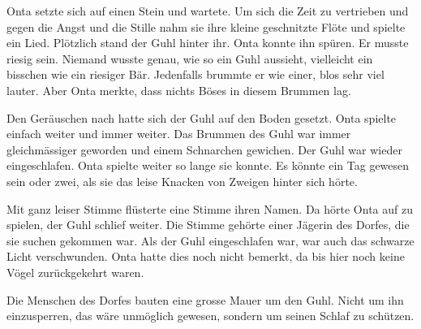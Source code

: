 Onta setzte sich auf einen Stein und wartete. Um sich die Zeit zu vertrieben und gegen die Angst und die Stille nahm sie ihre kleine geschnitzte Flöte und spielte ein Lied. Plötzlich stand der Guhl hinter ihr. Onta konnte ihn spüren. Er musste riesig sein. Niemand wusste genau, wie so ein Guhl aussieht, vielleicht ein bisschen wie ein riesiger Bär. Jedenfalls brummte er wie einer, blos sehr viel lauter. Aber Onta merkte, dass nichts Böses in diesem Brummen lag. 

Den Geräuschen nach hatte sich der Guhl auf den Boden gesetzt. Onta spielte einfach weiter und immer weiter. Das Brummen des Guhl war immer gleichmässiger geworden und einem Schnarchen gewichen. Der Guhl war wieder eingeschlafen. Onta spielte weiter so lange sie konnte. Es könnte ein Tag gewesen sein oder zwei, als sie das leise Knacken von Zweigen hinter sich hörte.

Mit ganz leiser Stimme flüsterte eine Stimme ihren Namen. Da hörte Onta auf zu spielen, der Guhl schlief weiter. Die Stimme gehörte einer Jägerin des Dorfes, die sie suchen gekommen war. Als der Guhl eingeschlafen war, war auch das schwarze Licht verschwunden. Onta hatte dies noch nicht bemerkt, da bis hier noch keine Vögel zurückgekehrt waren.

Die Menschen des Dorfes bauten eine grosse Mauer um den Guhl. Nicht um ihn einzusperren, das wäre unmöglich gewesen, sondern um seinen Schlaf zu schützen.  \hfill {\color{red}\decofourleft}
